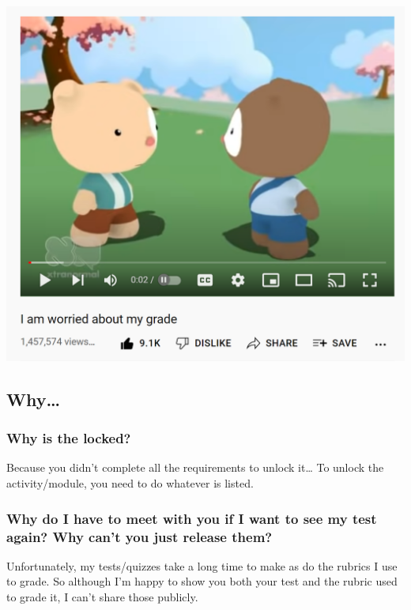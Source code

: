 \includegraphics[width=18.14in]{img/worriedgrade}

\hypertarget{why}{%
\subsection{Why\ldots{}}\label{why}}

\hypertarget{why-is-the-locked}{%
\subsubsection{\texorpdfstring{Why is the locked?}{Why is the  locked?}}\label{why-is-the-locked}}

Because you didn't complete all the requirements to unlock it\ldots{} To unlock the activity/module, you need to do whatever is listed.

\hypertarget{why-do-i-have-to-meet-with-you-if-i-want-to-see-my-test-again-why-cant-you-just-release-them}{%
\subsubsection{Why do I have to meet with you if I want to see my test again? Why can't you just release them?}\label{why-do-i-have-to-meet-with-you-if-i-want-to-see-my-test-again-why-cant-you-just-release-them}}

Unfortunately, my tests/quizzes take a long time to make as do the rubrics I use to grade. So although I'm happy to show you both your test and the rubric used to grade it, I can't share those publicly.

